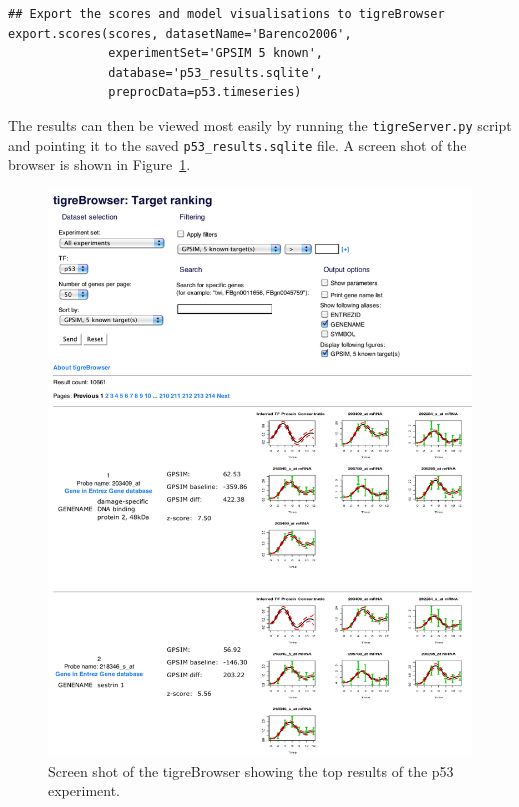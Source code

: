 \documentclass[11pt]{article}
\begin{document}
\begin{lstlisting}[frame=single]
## Export the scores and model visualisations to tigreBrowser
export.scores(scores, datasetName='Barenco2006',
              experimentSet='GPSIM 5 known',
              database='p53_results.sqlite',
              preprocData=p53.timeseries)
\end{lstlisting}

The results can then be viewed most easily by running the
\texttt{tigreServer.py} script and pointing it to the saved
\texttt{p53\_results.sqlite} file.  A screen shot of the
browser is shown in Figure~\ref{fig:browser_screenshot}.

\begin{figure}[htbp]
  \centering
  \includegraphics[width=\textwidth]{browser_screenshot.pdf}
  \caption{Screen shot of the tigreBrowser showing the top results of
    the p53 experiment.}
  \label{fig:browser_screenshot}
\end{figure}
\end{document}
